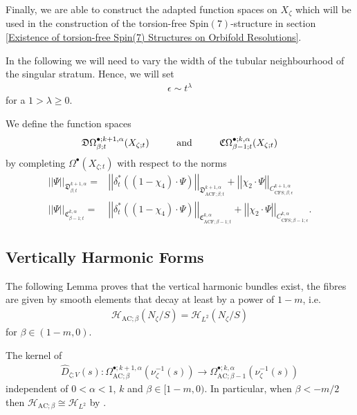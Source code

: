 \documentclass[psamsfonts]{amsart}
\theoremstyle{plain}
\theoremstyle{definition}{
\newtheorem{defi}{Definition}[section]
\newtheorem{ass}{Assumption}
\newtheorem*{nota}{Notation}}
\theoremstyle{remark}{
\newtheorem{rem}{Remark}
\newtheorem{ex}{Example}}
\theoremstyle{plain}{
\newtheorem{thm}{Theorem}[section]
\newtheorem{lem}{Lemma}[section]
\newtheorem{cor}{Corollary}[section]
\newtheorem{prop}{Proposition}[section]
\newtheorem{con}{Conjecture}[section]}
\newcommand{\m}[1]{{\mathrm{#1}}}
\newcommand{\und}[1]{\hspace{#1}\text{and}\hspace{#1}}
\begin{document}
Finally, we are able to construct the adapted function spaces on $X_\zeta$ which will be used in the construction of the torsion-free $\m{Spin}(7)$-structure in section \ref{Existence of torsion-free Spin(7) Structures on Orbifold Resolutions}.

\begin{nota}
    In the following we will need to vary the width of the tubular neighbourhood of the singular stratum. Hence, we will set 
\begin{align*}
    \epsilon\sim t^\lambda
\end{align*}
for a $1>\lambda\geq 0$.
\end{nota}

\begin{defi}
    We define the function spaces 
\begin{align*}
    \mathfrak{D}\Omega^{\bullet;k+1,\alpha}_{\beta;t}(X_{\zeta;t})\und{1.0cm}\mathfrak{C}\Omega^{\bullet;k,\alpha}_{\beta-1;t}(X_{\zeta;t})
\end{align*}
by completing $\Omega^{\bullet}(X_{\zeta;t})$  with respect to the norms
    \begin{align*}
        \left|\left|\Psi\right|\right|_{\mathfrak{D}^{k+1,\alpha}_{\beta;t}}=&\left|\left|\delta^*_t\left((1-\chi_4)\cdot\Psi\right)\right|\right|_{\mathfrak{D}^{k+1,\alpha}_{\m{ACF};\beta;t}}+\left|\left|\chi_2\cdot\Psi\right|\right|_{C^{k+1,\alpha}_{\m{CFS};\beta;\epsilon}}\\
\left|\left|\Psi\right|\right|_{\mathfrak{C}^{k,\alpha}_{\beta-1;t}}=&\left|\left|\delta^*_t\left((1-\chi_4)\cdot\Psi\right)\right|\right|_{\mathfrak{C}^{k,\alpha}_{\m{ACF};\beta-1;t}}+\left|\left|\chi_2\cdot\Psi\right|\right|_{C^{k,\alpha}_{\m{CFS};\beta-1;\epsilon}}.
    \end{align*}
\end{defi}

\subsection{Vertically Harmonic Forms}
\label{Vertically Harmonic Forms}


The following Lemma proves that the vertical harmonic bundles exist, the fibres are given by smooth elements that decay at least by a power of $1-m$, i.e. 
\begin{align*}
    \mathcal{H}_{\m{AC};\beta}(N_\zeta/S)=\mathcal{H}_{L^2}(N_\zeta/S)
\end{align*}
for $\beta\in(1-m,0)$.

\begin{lem}
\label{adiabaticmircokernels}
The kernel of
\begin{align*}
    \widehat{D}_{\zeta;V}(s)\colon   \Omega^{\bullet;k+1,\alpha}_{\m{AC};\beta}(\nu_\zeta^{-1}(s))\rightarrow  \Omega^{\bullet;k,\alpha}_{\m{AC};\beta-1}(\nu_\zeta^{-1}(s))
\end{align*}
independent of $0<\alpha<1$, $k$ and $\beta\in[1-m,0)$. In particular, when $\beta<-m/2$ then $\mathcal{H}_{\m{AC};\beta}\cong\mathcal{H}_{L^2}$ by \cite{lockhart1985elliptic}.
\end{lem}
\end{document}
